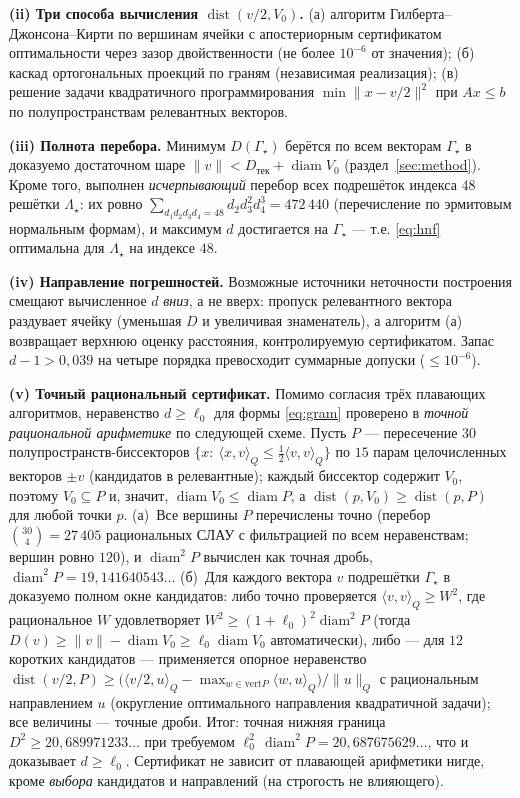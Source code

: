 \documentclass[12pt]{article}
\theoremstyle{definition}
\theoremstyle{remark}
\newcommand{\diam}{\operatorname{diam}}
\newcommand{\dist}{\operatorname{dist}}
\begin{document}
\textbf{(ii) Три способа вычисления $\dist(v/2,V_0)$.} (а) алгоритм
Гилберта--Джонсона--Кирти по вершинам ячейки с апостериорным сертификатом
оптимальности через зазор двойственности (не более $10^{-6}$ от значения);
(б) каскад ортогональных проекций по граням (независимая реализация);
(в) решение задачи квадратичного программирования
$\min\|x-v/2\|^2$ при $Ax\le b$ по полупространствам релевантных векторов.

\textbf{(iii) Полнота перебора.} Минимум $D(\Gamma_\star)$ берётся по всем
векторам $\Gamma_\star$ в доказуемо достаточном шаре
$\|v\|<D_{\text{тек}}+\diam V_0$ (раздел~\ref{sec:method}). Кроме того,
выполнен \emph{исчерпывающий} перебор всех подрешёток индекса $48$ решётки
$\Lambda_\star$: их ровно
$\sum_{d_1d_2d_3d_4=48}d_2d_3^2d_4^3=472\,440$ (перечисление по эрмитовым
нормальным формам), и максимум $d$ достигается на $\Gamma_\star$ ---
т.е. \eqref{eq:hnf} оптимальна для $\Lambda_\star$ на индексе $48$.

\textbf{(iv) Направление погрешностей.} Возможные источники неточности
построения смещают вычисленное $d$ \emph{вниз}, а не вверх: пропуск
релевантного вектора раздувает ячейку (уменьшая $D$ и увеличивая знаменатель),
а алгоритм (а) возвращает верхнюю оценку расстояния, контролируемую
сертификатом. Запас $d-1>0{,}039$ на четыре порядка превосходит суммарные
допуски ($\le 10^{-6}$).

\textbf{(v) Точный рациональный сертификат.} Помимо согласия трёх плавающих
алгоритмов, неравенство $d\ge\ell_0$ для формы \eqref{eq:gram} проверено в
\emph{точной рациональной арифметике} по следующей схеме. Пусть $P$ ---
пересечение $30$ полупространств-биссекторов
$\{x:\ \langle x,v\rangle_Q\le\tfrac12\langle v,v\rangle_Q\}$ по $15$ парам
целочисленных векторов $\pm v$ (кандидатов в релевантные); каждый биссектор
содержит $V_0$, поэтому $V_0\subseteq P$ и, значит,
$\diam V_0\le\diam P$, а $\dist(p,V_0)\ge\dist(p,P)$ для любой точки $p$.
(а)~Все вершины $P$ перечислены точно (перебор $\binom{30}{4}=27\,405$
рациональных СЛАУ с фильтрацией по всем неравенствам; вершин ровно $120$), и
$\diam^2 P$ вычислен как точная дробь,
$\diam^2 P=19{,}141640543\ldots$
(б)~Для каждого вектора $v$ подрешётки $\Gamma_\star$ в доказуемо полном окне
кандидатов: либо точно проверяется $\langle v,v\rangle_Q\ge W^2$, где
рациональное $W$ удовлетворяет $W^2\ge(1+\ell_0)^2\diam^2P$ (тогда
$D(v)\ge\|v\|-\diam V_0\ge\ell_0\diam V_0$ автоматически), либо --- для $12$
коротких кандидатов --- применяется опорное неравенство
$\dist(v/2,P)\ge\bigl(\langle v/2,u\rangle_Q-\max_{w\in\mathrm{vert}P}
\langle w,u\rangle_Q\bigr)/\|u\|_Q$
с рациональным направлением $u$ (округление оптимального направления
квадратичной задачи); все величины --- точные дроби.
Итог: точная нижняя граница $D^2\ge20{,}689971233\ldots$ при требуемом
$\ell_0^2\,\diam^2P=20{,}687675629\ldots$, что и доказывает
$d\ge\ell_0$. Сертификат не зависит от плавающей арифметики нигде, кроме
\emph{выбора} кандидатов и направлений (на строгость не влияющего).
\end{document}
